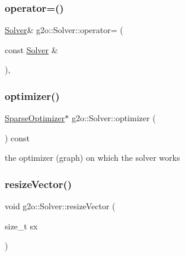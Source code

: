 \subsubsection{\texorpdfstring{operator=()}{operator=()}}
{\footnotesize\ttfamily \mbox{\hyperlink{classg2o_1_1_solver}{Solver}}\& g2o\+::\+Solver\+::operator= (\begin{DoxyParamCaption}\item[{const \mbox{\hyperlink{classg2o_1_1_solver}{Solver}} \&}]{ }\end{DoxyParamCaption})\hspace{0.3cm}{\ttfamily [inline]}, {\ttfamily [private]}}

\mbox{\label{classg2o_1_1_solver_a266bc31d289e824de6166522579ed385}} 
\subsubsection{\texorpdfstring{optimizer()}{optimizer()}}
{\footnotesize\ttfamily \mbox{\hyperlink{classg2o_1_1_sparse_optimizer}{Sparse\+Optimizer}}$\ast$ g2o\+::\+Solver\+::optimizer (\begin{DoxyParamCaption}{ }\end{DoxyParamCaption}) const\hspace{0.3cm}{\ttfamily [inline]}}



the optimizer (graph) on which the solver works 

\mbox{\label{classg2o_1_1_solver_ad1f85839e85f3e2c49112fb7e2b843ad}} 
\subsubsection{\texorpdfstring{resize\+Vector()}{resizeVector()}}
{\footnotesize\ttfamily void g2o\+::\+Solver\+::resize\+Vector (\begin{DoxyParamCaption}\item[{size\+\_\+t}]{sx }\end{DoxyParamCaption})\hspace{0.3cm}{\ttfamily [protected]}}

\mbox{\label{classg2o_1_1_solver_a3c40dae9b999c4d18e57b02fd0e0ade2}} 
